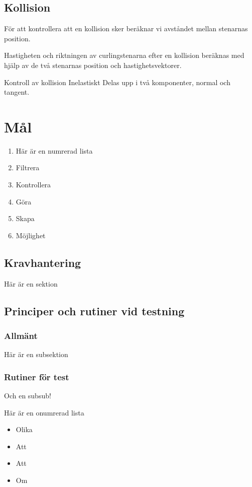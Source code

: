 \documentclass[11pt]{article} %
\begin{document}
\subsection{Kollision}

För att kontrollera att en kollision sker beräknar vi avståndet mellan stenarnas position.

Hastigheten och riktningen av curlingstenarna efter en kollision beräknas med hjälp av de två stenarnas position och hastighetsvektorer. 

Kontroll av kollision
Inelastiskt
Delas upp i två komponenter, normal och tangent.




\section{Mål}



\begin{enumerate}
\item Här är en numrerad lista
\item Filtrera 
\item Kontrollera 
\item Göra 
\item Skapa 
\item Möjlighet 
\end{enumerate}


\pagebreak 



\subsection{Kravhantering}

Här är en sektion

\subsection{Principer och rutiner vid testning}

\subsubsection{Allmänt}
Här är en subsektion

\subsubsection{Rutiner för test}
Och en subsub!

Här är en onumrerad lista
\begin{itemize}
\item Olika
\item Att 
\item Att
\item Om 
\end{itemize}
\end{document}

